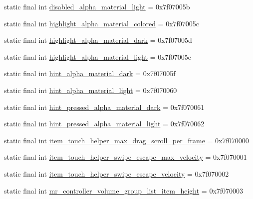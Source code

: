 \begin{CompactItemize}
\item 
static final int \hyperlink{classandroid_1_1support_1_1mediacompat_1_1_r_1_1dimen_05debec3446c5889800ebc923edb4b15}{disabled\_\-alpha\_\-material\_\-light} = 0x7f07005b
\item 
static final int \hyperlink{classandroid_1_1support_1_1mediacompat_1_1_r_1_1dimen_435572ce0303e1e959853bddf8f56a16}{highlight\_\-alpha\_\-material\_\-colored} = 0x7f07005c
\item 
static final int \hyperlink{classandroid_1_1support_1_1mediacompat_1_1_r_1_1dimen_067a4cff0db25a354c2554695279f62b}{highlight\_\-alpha\_\-material\_\-dark} = 0x7f07005d
\item 
static final int \hyperlink{classandroid_1_1support_1_1mediacompat_1_1_r_1_1dimen_37b3522e969b38b4f1e689d5920df906}{highlight\_\-alpha\_\-material\_\-light} = 0x7f07005e
\item 
static final int \hyperlink{classandroid_1_1support_1_1mediacompat_1_1_r_1_1dimen_9360e88e1eb0554a560810c3f96e848f}{hint\_\-alpha\_\-material\_\-dark} = 0x7f07005f
\item 
static final int \hyperlink{classandroid_1_1support_1_1mediacompat_1_1_r_1_1dimen_1f253c8a571f0c7b6eb1ff05e517aad0}{hint\_\-alpha\_\-material\_\-light} = 0x7f070060
\item 
static final int \hyperlink{classandroid_1_1support_1_1mediacompat_1_1_r_1_1dimen_0d6d2eb7cc8e55162bd1618af027866d}{hint\_\-pressed\_\-alpha\_\-material\_\-dark} = 0x7f070061
\item 
static final int \hyperlink{classandroid_1_1support_1_1mediacompat_1_1_r_1_1dimen_a83c943e5732c386fb369f71d7b9ae61}{hint\_\-pressed\_\-alpha\_\-material\_\-light} = 0x7f070062
\item 
static final int \hyperlink{classandroid_1_1support_1_1mediacompat_1_1_r_1_1dimen_41a262c884b1225aa54f704d1cef6aec}{item\_\-touch\_\-helper\_\-max\_\-drag\_\-scroll\_\-per\_\-frame} = 0x7f070000
\item 
static final int \hyperlink{classandroid_1_1support_1_1mediacompat_1_1_r_1_1dimen_af20fc7fb66f127ced572d4b1bd8ccf1}{item\_\-touch\_\-helper\_\-swipe\_\-escape\_\-max\_\-velocity} = 0x7f070001
\item 
static final int \hyperlink{classandroid_1_1support_1_1mediacompat_1_1_r_1_1dimen_5fdc7caba3262dd918259fa8c2b73ede}{item\_\-touch\_\-helper\_\-swipe\_\-escape\_\-velocity} = 0x7f070002
\item 
static final int \hyperlink{classandroid_1_1support_1_1mediacompat_1_1_r_1_1dimen_0f8096cd34f4b57d8f91905416df8826}{mr\_\-controller\_\-volume\_\-group\_\-list\_\-item\_\-height} = 0x7f070003

\end{CompactItemize}
